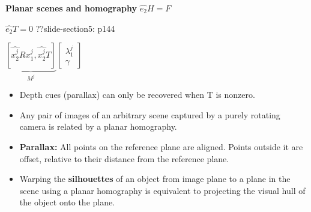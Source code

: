 \documentclass{../cheat}
\begin{document}
\begin{multicols}{3}
	\textbf{Planar scenes and homography}
	$\widehat{e_2}H=F$
	
	$\widehat{e_2}T=0$ ??slide-section5: p144
	
	\centerline{
	$\underbrace{\left[\widehat{x_2^j} R x_1^j,\widehat{x_2^j}T \right]}_{M^j} \begin{bmatrix}
	\lambda_1^j \\ \gamma
	\end{bmatrix}$	}

	\begin{itemize}[nolistsep, leftmargin=1em]
		\item Depth cues (parallax) can only be recovered when T is nonzero.
		\item Any pair of images of an arbitrary scene captured by a purely rotating camera is related by a planar homography.
		\item \textbf{Parallax:} All points on the reference plane are aligned. Points outside it are offset, relative to their distance from the reference plane.
		\item Warping the \textbf{silhouettes} of an object from image plane to a plane in the scene using a planar homography is equivalent to projecting the visual hull of the object onto the plane.
	\end{itemize}
	

\end{multicols}
\end{document}

